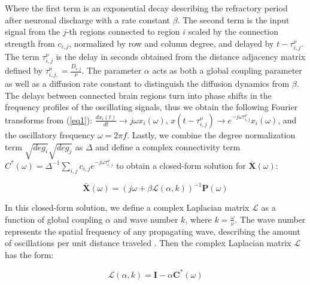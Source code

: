 \documentclass{article}
\begin{document}
Where the first term is an exponential decay describing the refractory period after neuronal discharge with a rate constant $\beta$. The second term is the input signal from the $j$-th regions connected to region $i$ scaled by the connection strength from $c_{i,j}$, normalized by row and column degree, and delayed by $t-\tau^{\nu}_{i,j}$. The term $\tau^{\nu}_{i,j}$ is the delay in seconds obtained from the distance adjacency matrix defined by $\tau^{\nu}_{i,j,} = \frac{D_{i,j}}{\nu}$. The parameter $\alpha$ acts as both a global coupling parameter as well as a diffusion rate constant to distinguish the diffusion dynamics from $\beta$. The delays between connected brain regions turn into phase shifts in the frequency profiles of the oscillating signals, thus we obtain the following Fourier transforms from (\ref{eq1}): $\frac{dx_{i}(t)}{dt} \to j\omega x_{i}(\omega)$, $x(t-\tau^{\nu}_{i,j}) \to e^{-j\omega \tau^{\nu}_{i,j}} x_{i}(\omega)$, and the oscillatory frequency $\omega = 2 \pi f$. Lastly, we combine the degree normalization term $\sqrt{deg_i}\sqrt{deg_j}$ as $\Delta$ and define a complex connectivity term $C^{*}(\omega) = \Delta^{-1} \sum_{i,j} c_{i,j}e^{-j\omega \tau^{\nu}_{i,j}}$ to obtain a closed-form solution for $\pmb{\bar{X}}(\omega)$:

\begin{equation}
\label{eq2}
\pmb{\bar{X}}(\omega) = (j\omega + \beta \mathcal{L}(\alpha, k))^{-1} \pmb{P}(\omega)
\end{equation}

In this closed-form solution, we define a complex Laplacian matrix $\mathcal{L}$ as a function of global coupling $\alpha$ and wave number $k$, where $k = \frac{\omega}{\nu}$. The wave number represents the spatial frequency of any propagating wave, describing the amount of oscillations per unit distance traveled \cite{French1971}. Then the complex Laplacian matrix $\mathcal{L}$ has the form:

\begin{equation}
    \label{eq3}
    \mathcal{L}(\alpha, k) = \pmb{I} - \alpha \pmb{C}^{*}(\omega)
\end{equation}
\end{document}
